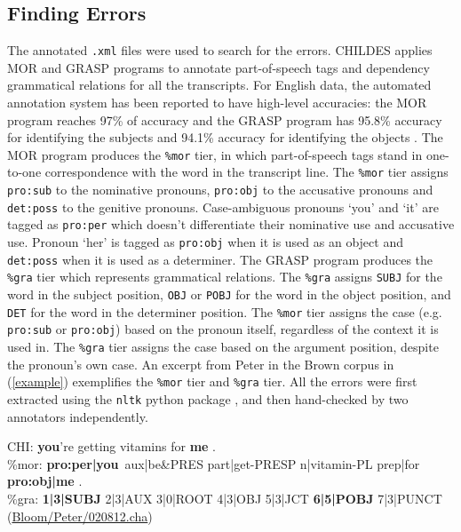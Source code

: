 \subsection{Finding Errors}
The annotated \texttt{.xml} files were used to search for the errors. CHILDES applies MOR and GRASP programs to annotate part-of-speech tags and dependency grammatical relations for all the transcripts. For English data, the automated annotation system has been reported to have high-level accuracies: the MOR program reaches 97\% of accuracy and the GRASP program has 95.8\% accuracy for identifying the subjects and 94.1\% accuracy for identifying the objects \citep{macwhinney2012morphosyntactic,sagae2010morphosyntactic}. The MOR program produces the \texttt{\%mor} tier, in which part-of-speech tags stand in one-to-one correspondence with the word in the transcript line. The \texttt{\%mor} tier assigns \texttt{pro:sub} to the nominative pronouns, \texttt{pro:obj} to the accusative pronouns and \texttt{det:poss} to the genitive pronouns. Case-ambiguous pronouns `you' and `it' are tagged as \texttt{pro:per} which doesn't differentiate their nominative use and accusative use. Pronoun `her' is tagged as \texttt{pro:obj} when it is used as an object and \texttt{det:poss} when it is used as a determiner. The GRASP program produces the \texttt{\%gra} tier which represents grammatical relations. The \texttt{\%gra} assigns \texttt{SUBJ} for the word in the subject position,  \texttt{OBJ} or \texttt{POBJ} for the word in the object position, and \texttt{DET} for the word in the determiner position. The \texttt{\%mor} tier assigns the case (e.g. \texttt{pro:sub} or \texttt{pro:obj}) based on the pronoun itself, regardless of the context it is used in. The \texttt{\%gra} tier assigns the case based on the argument position, despite the pronoun's own case. An excerpt from Peter in the Brown corpus in (\ref{example}) exemplifies the \texttt{\%mor} tier and \texttt{\%gra} tier. All the errors were first extracted using the \texttt{nltk} python package \citep{bird2009natural}, and then hand-checked by two annotators independently. 
\begin{exe}
\ex \label{example} \gll *CHI: \textbf{you}'re getting vitamins for \textbf{me }.\\
\%mor:	\textbf{pro:per|you}~aux|be&PRES part|get-PRESP n|vitamin-PL prep|for \textbf{pro:obj|me} .\\
\%gra:\textbf{	1|3|SUBJ} 2|3|AUX 3|0|ROOT 4|3|OBJ 5|3|JCT \textbf{6|5|POBJ} 7|3|PUNCT\\
(\href{https://childes.talkbank.org/browser/index.php?url=Eng-NA/Bloom/Peter/020812.cha}{Bloom/Peter/020812.cha})
\end{exe}

